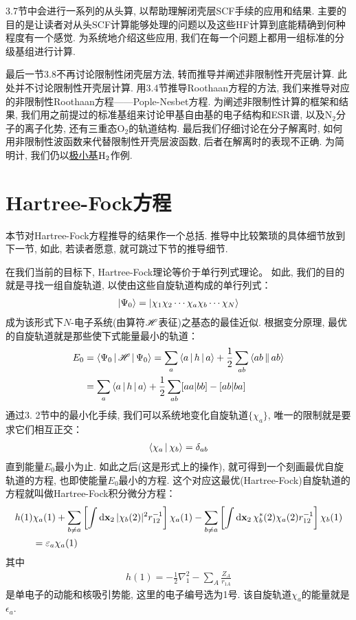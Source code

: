 3.7节中会进行一系列的从头算, 以帮助理解闭壳层SCF手续的应用和结果. 
主要的目的是让读者对从头SCF计算能够处理的问题以及这些HF计算到底能精确到何种程度有一个感觉. 
为系统地介绍这些应用, 我们在每一个问题上都用一组标准的分级基组进行计算.

最后一节3.8不再讨论限制性闭壳层方法, 
转而推导并阐述非限制性开壳层计算. 
此处并不讨论限制性开壳层计算. 
用3.4节推导Roothaan方程的方法, 
我们来推导对应的非限制性Roothaan方程——Pople-Nesbet方程. 
为阐述非限制性计算的框架和结果, 
我们用之前提过的标准基组来讨论甲基自由基的电子结构和ESR谱, 
以及$\mathrm{N}_2$分子的离子化势, 
还有三重态$\mathrm{O}_2$的轨道结构. 
最后我们仔细讨论在分子解离时, 
如何用非限制性波函数来代替限制性开壳层波函数, 
后者在解离时的表现不正确. 
为简明计, 
我们仍以\underline{极小基$\mathrm{H}_2$}作例.


\section{Hartree-Fock方程}
本节对Hartree-Fock方程推导的结果作一个总括. 
推导中比较繁琐的具体细节放到下一节, 
如此, 
若读者愿意, 
就可跳过下节的推导细节. 


在我们当前的目标下, Hartree-Fock理论等价于单行列式理论。
如此, 我们的目的就是寻找一组自旋轨道, 以使由这些自旋轨道构成的单行列式：
\begin{align}
	\Ket{\Psi_0} = \Ket{\chi_1\chi_2\cdots\chi_a\chi_b\cdots\chi_N}
\end{align}
成为该形式下$N$-电子系统(由算符$\mathscr{H}$表征)之基态的最佳近似. 
根据变分原理, 
最优的自旋轨道就是那些使下式能量最小的轨道：
\begin{align}
	E_0 & = \Braket{\Psi_0|\mathscr{H}|\Psi_0} = \sum_a\Braket{a|h|a} + \frac{1}{2}\sum_{ab}\Braket{ab||ab}\notag \\
	& = \sum_a\Braket{a|h|a} + \frac{1}{2}\sum_{ab}[aa|bb]-[ab|ba]
\end{align}
通过3.
2节中的最小化手续, 
我们可以系统地变化自旋轨道$\{\chi_a\}$, 
唯一的限制就是要求它们相互正交：
\begin{align}
	\Braket{\chi_a|\chi_b} = \delta_{ab}
\end{align} 
直到能量$E_0$最小为止. 
如此之后(这是形式上的操作), 
就可得到一个刻画最优自旋轨道的方程, 
也即使能量$E_0$最小的方程. 
这个对应这最优(Hartree-Fock)自旋轨道的方程就叫做Hartree-Fock积分微分方程：
\begin{align}
	\label{3.4}
	h(1)&\chi_a(1) + \sum_{b\neq a}\left[ \int\dd{x}_2\,|\chi_b(2)|^2 r_{12}^{-1} \right]\chi_a(1) - \sum_{b\neq a}\left[ \int\dd{x}_2\,\chi_b^*(2)\chi_a(2) r_{12}^{-1} \right]\chi_b(1)\notag\\
	&=\epsilon_a\chi_a(1)
\end{align}
其中
\begin{align}
	h(1) = -\frac{1}{2}\nabla_1^2 - \sum_A\frac{Z_A}{r_{1A}}
\end{align}
是单电子的动能和核吸引势能, 
这里的电子编号选为1号. 
该自旋轨道$\chi_a$的能量就是$\epsilon_a$.



